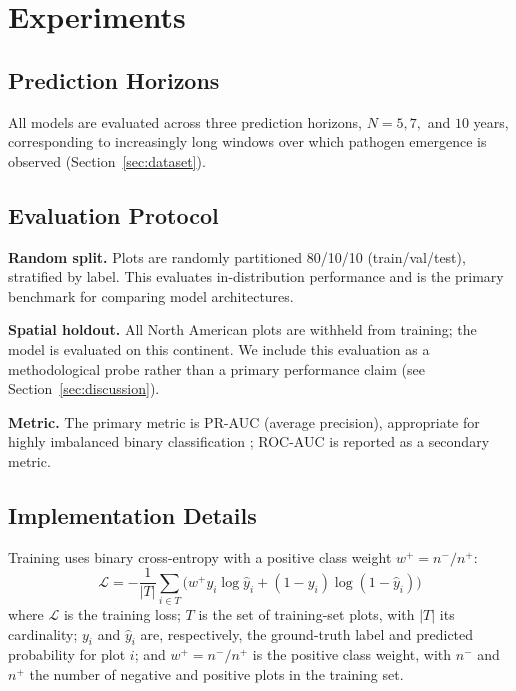 \documentclass[a4paper,fleqn]{cas-sc}
\begin{document}
\section{Experiments}
\label{sec:expsetup}

\subsection{Prediction Horizons}

All models are evaluated across three prediction horizons, $N = 5, 7,$ and $10$ years, corresponding to increasingly long windows over which pathogen emergence is observed (Section~\ref{sec:dataset}).

\subsection{Evaluation Protocol}

\textbf{Random split.} Plots are randomly partitioned 80/10/10 (train/val/test), stratified by label. This evaluates in-distribution performance and is the primary benchmark for comparing model architectures.

\textbf{Spatial holdout.} All North American plots are withheld from training; the model is evaluated on this continent. We include this evaluation as a methodological probe rather than a primary performance claim (see Section~\ref{sec:discussion}).

\textbf{Metric.} The primary metric is PR-AUC (average precision), appropriate for highly imbalanced binary classification \citep{saito2015}; ROC-AUC is reported as a secondary metric.

\subsection{Implementation Details}

Training uses binary cross-entropy with a positive class weight $w^+ = n^-/n^+$:
\begin{equation}
\label{eq:loss}
\mathcal{L} = -\frac{1}{|T|}\sum_{i \in T}\Big( w^+ y_i \log \hat{y}_i + (1-y_i)\log(1-\hat{y}_i) \Big)
\end{equation}
where $\mathcal{L}$ is the training loss; $T$ is the set of training-set plots, with $|T|$ its cardinality; $y_i$ and $\hat{y}_i$ are, respectively, the ground-truth label and predicted probability for plot $i$; and $w^+ = n^-/n^+$ is the positive class weight, with $n^-$ and $n^+$ the number of negative and positive plots in the training set.
\end{document}
